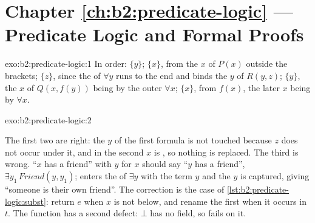 \section*{Chapter \ref{ch:b2:predicate-logic} --- Predicate Logic and Formal Proofs}

\begin{solution}{exo:b2:predicate-logic:1}
In order: $\{y\}$; $\{x\}$, from the $x$ of $P(x)$ outside the brackets; $\{z\}$, since the  of $\forall y$ runs
to the end and binds the $y$ of $R(y, z)$; $\{y\}$, the $x$ of $Q(x, f(y))$ being  by the outer $\forall x$;
$\{x\}$, from $f(x)$, the later $x$ being  by $\forall x$.

\end{solution}

\begin{solution}{exo:b2:predicate-logic:2}

The first two are right: the  $y$ of the first formula is not touched because $z$ does not occur under it, and in
the second $x$ is , so nothing is replaced. The third is wrong. ``$x$ has a friend'' with $y$ for $x$ should say
``$y$ has a friend'', $\exists y_1\, \mathit{Friend}(y, y_1)$;  enters the  of $\exists y$ with the
term $y$ and the $y$ is captured, giving ``someone is their own friend''. The correction is the  case of
\cref{lst:b2:predicate-logic:subst}: return $e$ when $x$ is not  below, and rename the  first when it
occurs in $t$. The function has a second defect: $\bot$ has no  field, so  fails on it.
\end{solution}

